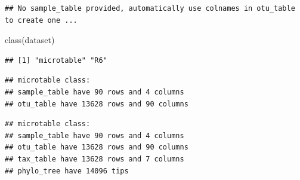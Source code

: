 \documentclass[
]{book}
\newenvironment{Shaded}{\begin{snugshade}}{\end{snugshade}}
\newcommand{\AttributeTok}[1]{\textcolor[rgb]{0.77,0.63,0.00}{#1}}
\newcommand{\CommentTok}[1]{\textcolor[rgb]{0.56,0.35,0.01}{\textit{#1}}}
\newcommand{\FunctionTok}[1]{\textcolor[rgb]{0.00,0.00,0.00}{#1}}
\newcommand{\NormalTok}[1]{#1}
\newcommand{\OtherTok}[1]{\textcolor[rgb]{0.56,0.35,0.01}{#1}}
\newcommand{\SpecialCharTok}[1]{\textcolor[rgb]{0.00,0.00,0.00}{#1}}
\begin{document}
\begin{verbatim}
## No sample_table provided, automatically use colnames in otu_table to create one ...
\end{verbatim}

\begin{Shaded}
\begin{Highlighting}[]
\FunctionTok{class}\NormalTok{(dataset)}
\end{Highlighting}
\end{Shaded}

\begin{verbatim}
## [1] "microtable" "R6"
\end{verbatim}

\begin{Shaded}
\end{Shaded}

\begin{verbatim}
## microtable class:
## sample_table have 90 rows and 4 columns
## otu_table have 13628 rows and 90 columns
\end{verbatim}

\begin{Shaded}
\end{Shaded}

\begin{verbatim}
## microtable class:
## sample_table have 90 rows and 4 columns
## otu_table have 13628 rows and 90 columns
## tax_table have 13628 rows and 7 columns
## phylo_tree have 14096 tips
\end{verbatim}
\end{document}
